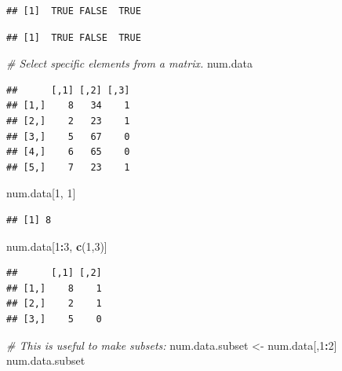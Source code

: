 \documentclass[
]{article}
\newenvironment{Shaded}{\begin{snugshade}}{\end{snugshade}}
\newcommand{\CommentTok}[1]{\textcolor[rgb]{0.56,0.35,0.01}{\textit{#1}}}
\newcommand{\DecValTok}[1]{\textcolor[rgb]{0.00,0.00,0.81}{#1}}
\newcommand{\KeywordTok}[1]{\textcolor[rgb]{0.13,0.29,0.53}{\textbf{#1}}}
\newcommand{\NormalTok}[1]{#1}
\newcommand{\OperatorTok}[1]{\textcolor[rgb]{0.81,0.36,0.00}{\textbf{#1}}}
\newcommand{\StringTok}[1]{\textcolor[rgb]{0.31,0.60,0.02}{#1}}
\begin{document}
\begin{verbatim}
## [1]  TRUE FALSE  TRUE
\end{verbatim}

\begin{Shaded}
\end{Shaded}

\begin{verbatim}
## [1]  TRUE FALSE  TRUE
\end{verbatim}

\begin{Shaded}
\begin{Highlighting}[]
\CommentTok{# Select specific elements from a matrix.}
\NormalTok{num.data}
\end{Highlighting}
\end{Shaded}

\begin{verbatim}
##      [,1] [,2] [,3]
## [1,]    8   34    1
## [2,]    2   23    1
## [3,]    5   67    0
## [4,]    6   65    0
## [5,]    7   23    1
\end{verbatim}

\begin{Shaded}
\begin{Highlighting}[]
\NormalTok{num.data[}\DecValTok{1}\NormalTok{, }\DecValTok{1}\NormalTok{]}
\end{Highlighting}
\end{Shaded}

\begin{verbatim}
## [1] 8
\end{verbatim}

\begin{Shaded}
\begin{Highlighting}[]
\NormalTok{num.data[}\DecValTok{1}\OperatorTok{:}\DecValTok{3}\NormalTok{, }\KeywordTok{c}\NormalTok{(}\DecValTok{1}\NormalTok{,}\DecValTok{3}\NormalTok{)]}
\end{Highlighting}
\end{Shaded}

\begin{verbatim}
##      [,1] [,2]
## [1,]    8    1
## [2,]    2    1
## [3,]    5    0
\end{verbatim}

\begin{Shaded}
\begin{Highlighting}[]
\CommentTok{# This is useful to make subsets:}
\NormalTok{num.data.subset <-}\StringTok{ }\NormalTok{num.data[,}\DecValTok{1}\OperatorTok{:}\DecValTok{2}\NormalTok{]}
\NormalTok{num.data.subset}
\end{Highlighting}
\end{Shaded}
\end{document}
